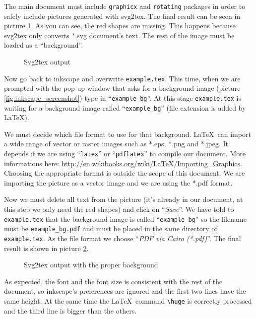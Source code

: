 \documentclass[a4paper,12pt]{article}
\begin{document}
The main document must include \texttt{graphicx} and \texttt{rotating} packages in order to safely include pictures generated with svg2tex. The final result can be seen in picture \ref{fig:inkscape_tutorial_result_1}. As you can see, the red shapes are missing. This happens because svg2tex only converts *.svg document's text. The rest of the image must be loaded as a ``background''.
\begin{figure}[tb]
  \centering
  
  \caption{Svg2tex output}
  \label{fig:inkscape_tutorial_result_1}
\end{figure}

Now go back to inkscape and overwrite \texttt{example.tex}. This time, when we are prompted with the pop-up window that asks for a background image (picture \ref{fig:inkscape_screenshot}) type in ``\texttt{example\_bg}''. At this stage \texttt{example.tex} is waiting for a background image called ``\texttt{example\_bg}'' (file extension is added by \LaTeX).

We must decide which file format to use for that background. \LaTeX\ can import a wide range of vector or raster images such as *.eps, *.png and *.jpeg. It depends if we are using ``\texttt{latex}'' or ``\texttt{pdflatex}'' to compile our document. More informations here: \url{http://en.wikibooks.org/wiki/LaTeX/Importing_Graphics}. Choosing the appropriate format is outside the scope of this document. We are importing the picture as a vector image and we are using the *.pdf format.

Now we must delete all text from the picture (it's already in our document, at this step we only need the red shapes) and click on ``\emph{Save}''. We have told to \texttt{example.tex} that the background image is called ``\texttt{example\_bg}'' so the filename must be \texttt{example\_bg.pdf} and must be placed in the same directory of \texttt{example.tex}. As the file format we choose ``\emph{PDF via Cairo (*.pdf)}''. The final result is shown in picture \ref{fig:inkscape_final_example}.
\begin{figure}[tb]
  \centering
  
  \caption{Svg2tex output with the proper background}
  \label{fig:inkscape_final_example}
\end{figure}

As expected, the font and the font size is consistent with the rest of the document, so inkscape's preferences are ignored and the first two lines have the same height. At the same time the \LaTeX\ command \texttt{\textbackslash huge} is correctly processed and the third line is bigger than the others.
\end{document}
